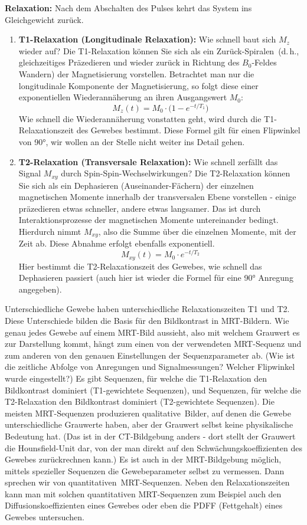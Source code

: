 \documentclass[a4paper,11pt]{article}
\newcommand{\Mxy}{M_{xy}}
\begin{document}
\textbf{Relaxation:} Nach dem Abschalten des Pulses kehrt das System ins Gleichgewicht zurück.
\begin{enumerate}
\item \textbf{T1-Relaxation (Longitudinale Relaxation):} Wie schnell baut sich $M_z$ wieder auf? Die T1-Relaxation können Sie sich als ein \glqq Zurück-Spiralen\grqq\ (d.\,h., gleichzeitiges Präzedieren und wieder zurück in Richtung des $B_0$-Feldes Wandern) der Magnetisierung vorstellen. Betrachtet man nur die longitudinale Komponente der Magnetisierung, so folgt diese einer exponentiellen Wiederannäherung an ihren Ausgangswert $M_0$:
\[
M_z(t) = M_0 \cdot \bigl(1 - e^{-t/T_1}\bigr)
\]
Wie schnell die Wiederannäherung vonstatten geht, wird durch die T1-Relaxationszeit des Gewebes bestimmt. Diese Formel gilt für einen Flipwinkel von 90°, wir wollen an der Stelle nicht weiter ins Detail gehen.
\item \textbf{T2-Relaxation (Transversale Relaxation):} Wie schnell zerfällt das Signal $\Mxy$ durch Spin-Spin-Wechselwirkungen? Die T2-Relaxation können Sie sich als ein Dephasieren (\glqq Auseinander-Fächern\grqq) der einzelnen magnetischen Momente innerhalb der transversalen Ebene vorstellen - einige präzedieren etwas schneller, andere etwas langsamer. Das ist durch Interaktionsprozesse der magnetischen Momente untereinander bedingt. Hierdurch nimmt $\Mxy$, also die Summe über die einzelnen Momente, mit der Zeit ab. Diese Abnahme erfolgt ebenfalls exponentiell.
\[
\Mxy(t) = M_0 \cdot e^{-t/T_2}
\]
Hier bestimmt die T2-Relaxationszeit des Gewebes, wie schnell das Dephasieren passiert (auch hier ist wieder die Formel für eine 90° Anregung angegeben).
\end{enumerate}

Unterschiedliche Gewebe haben unterschiedliche Relaxationszeiten T1 und T2. Diese Unterschiede bilden die Basis für den Bildkontrast in MRT-Bildern. Wie genau jedes Gewebe auf einem MRT-Bild aussieht, also mit welchem Grauwert es zur Darstellung kommt, hängt zum einen von der verwendeten MRT-Sequenz und zum anderen von den genauen Einstellungen der Sequenzparameter ab. (Wie ist die zeitliche Abfolge von Anregungen und Signalmessungen? Welcher Flipwinkel wurde eingestellt?) Es gibt Sequenzen, für welche die T1-Relaxation den Bildkontrast dominiert (T1-gewichtete Sequenzen), und Sequenzen, für welche die T2-Relaxation den Bildkontrast dominiert (T2-gewichtete Sequenzen). Die meisten MRT-Sequenzen produzieren \glqq qualitative\grqq\ Bilder, auf denen die Gewebe unterschiedliche Grauwerte haben, aber der Grauwert selbst keine physikalische Bedeutung hat. (Das ist in der CT-Bildgebung anders - dort stellt der Grauwert die Hounsfield-Unit dar, von der man direkt auf den Schwächungskoeffizienten des Gewebes zurückrechnen kann.) Es ist auch in der MRT-Bildgebung möglich, mittels spezieller Sequenzen die Gewebeparameter selbst zu vermessen. Dann sprechen wir von \glqq quantitativen\grqq\ MRT-Sequenzen. Neben den Relaxationszeiten kann man mit solchen quantitativen MRT-Sequenzen zum Beispiel auch den Diffusionskoeffizienten eines Gewebes oder eben die PDFF (Fettgehalt) eines Gewebes untersuchen.
\end{document}
